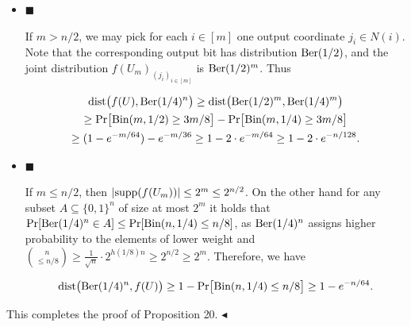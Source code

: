 \begin{itemize}


\item[] 
$\blacksquare$ 


If $m>n/2$, we may pick for each $i\in[m]$ one output coordinate $j_{i}\in N(i)$. Note that the corresponding output bit has distribution $\textnormal{Ber}(1/2)$, and the joint distribution $f(U_{m})_{(j_{i})_{i\in[m]}}$ is $\textnormal{Ber}(1/2)^{m}$. Thus\par


\[\begin{gathered}
\displaystyle\mathrm{dist}\bigl(f(U),\textnormal{Ber}(1/4)^{n}\bigr) \displaystyle\geq\mathrm{dist}\bigl(\textnormal{Ber}(1/2)^{m},\textnormal{Ber}(1/4)^{m}\bigr) \\
\displaystyle\geq\Pr\bigl[\textnormal{Bin}(m,1/2)\geq 3m/8\bigr]-\Pr\bigl[\textnormal{Bin}(m,1/4)\geq 3m/8\bigr] \\
\displaystyle\geq(1-e^{-m/64})-e^{-m/36}\geq 1-2\cdot e^{-m/64}\geq 1-2\cdot e^{-n/128}.
\end{gathered}\]





\item[] 
$\blacksquare$ 


If $m\leq n/2$, then $\lvert{\rm supp}(f(U_{m}))\rvert\leq 2^{m}\leq 2^{n/2}$.
On the other hand for any subset $A\subseteq\{0,1\}^{n}$ of size at most $2^{m}$ it holds that
$\Pr[\textnormal{Ber}(1/4)^{n}\in A]\leq\Pr[\textnormal{Bin}(n,1/4)\leq n/8]$, as $\textnormal{Ber}(1/4)^{n}$ assigns higher probability to the elements of lower weight and $\binom{n}{\leq n/8}\geq\frac{1}{\sqrt{n}}\cdot 2^{h(1/8)n}\geq 2^{n/2}\geq 2^{m}$.
Therefore, we have\par


\[\begin{gathered}
\mathrm{dist}\bigl(\textnormal{Ber}(1/4)^{n},f(U)\bigr)\geq 1-\Pr\bigl[\textnormal{Bin}(n,1/4)\leq n/8\bigr]\geq 1-e^{-n/64}.
\end{gathered}\]





\end{itemize}


This completes the proof of Proposition 20.
$\blacktriangleleft$\par





